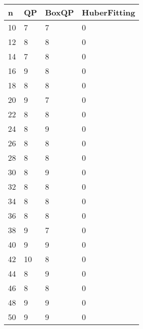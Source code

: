 \begin{tabular}{llll}
n & QP & BoxQP & HuberFitting \\ 
\hline 
10 & 7 & 7 & 0 \\ 
12 & 8 & 8 & 0 \\ 
14 & 7 & 8 & 0 \\ 
16 & 9 & 8 & 0 \\ 
18 & 8 & 8 & 0 \\ 
20 & 9 & 7 & 0 \\ 
22 & 8 & 8 & 0 \\ 
24 & 8 & 9 & 0 \\ 
26 & 8 & 8 & 0 \\ 
28 & 8 & 8 & 0 \\ 
30 & 8 & 9 & 0 \\ 
32 & 8 & 8 & 0 \\ 
34 & 8 & 8 & 0 \\ 
36 & 8 & 8 & 0 \\ 
38 & 9 & 7 & 0 \\ 
40 & 9 & 9 & 0 \\ 
42 & 10 & 8 & 0 \\ 
44 & 8 & 9 & 0 \\ 
46 & 8 & 8 & 0 \\ 
48 & 9 & 9 & 0 \\ 
50 & 9 & 9 & 0 \\ 
\hline 
\end{tabular}